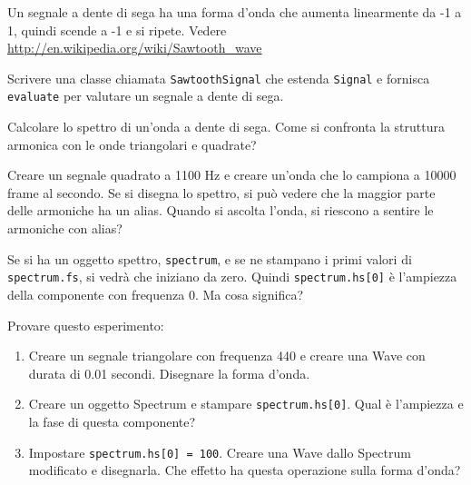 \documentclass[12pt]{book} \usepackage[width=5.5in,height=8.5in, hmarginratio=3:2,vmarginratio=1:1]{geometry}
\begin{document}
\begin{exercise} Un segnale a dente di sega ha una forma d'onda che aumenta linearmente da -1 a 1, quindi scende a -1 e si ripete. Vedere \url{http://en.wikipedia.org/wiki/Sawtooth_wave}

Scrivere una classe chiamata {\tt SawtoothSignal} che estenda {\tt Signal} e fornisca {\tt evaluate} per valutare un segnale a dente di sega.

Calcolare lo spettro di un'onda a dente di sega. Come si confronta la struttura armonica con le onde triangolari e quadrate? \end{exercise} 

\begin{exercise} Creare un segnale quadrato a 1100 Hz e creare un'onda che lo campiona a 10000 frame al secondo. Se si disegna lo spettro, si può vedere che la maggior parte delle armoniche ha un alias. Quando si ascolta l'onda, si riescono a sentire le armoniche con alias? \end{exercise} 

\begin{exercise} Se si ha un oggetto spettro, {\tt spectrum}, e se ne stampano i primi valori di {\tt spectrum.fs}, si vedrà che iniziano da zero. Quindi {\tt spectrum.hs[0]} è l'ampiezza della componente con frequenza 0. Ma cosa significa?

Provare questo esperimento:

\begin{enumerate} 

\item Creare un segnale triangolare con frequenza 440 e creare una Wave con durata di 0.01 secondi. Disegnare la forma d'onda.

\item Creare un oggetto Spectrum e stampare {\tt spectrum.hs[0]}. Qual è l'ampiezza e la fase di questa componente?

\item Impostare {\tt spectrum.hs[0] = 100}. Creare una Wave dallo Spectrum modificato e disegnarla. Che effetto ha questa operazione sulla forma d'onda?

\end{enumerate} 

\end{exercise} 
\end{document}
